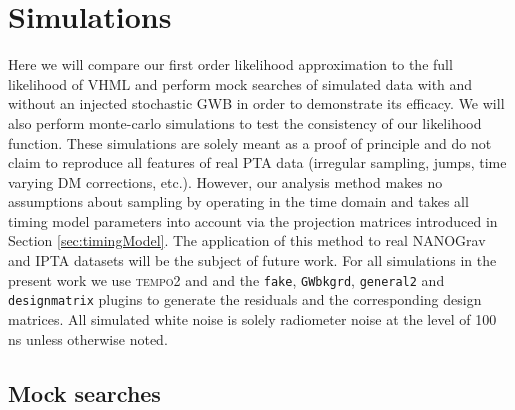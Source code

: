 \documentclass[iop]{emulateapj}
\begin{document}
\section{Simulations}
\label{sec:simulations}

Here we will compare our first order likelihood approximation to the full likelihood of VHML and perform mock searches of simulated data with and without an injected stochastic GWB in order to demonstrate its efficacy. We will also perform monte-carlo simulations to test the consistency of our likelihood function. These simulations are solely meant as a proof of principle and do not claim to reproduce all features of real PTA data (irregular sampling, jumps, time varying DM corrections, etc.). However, our analysis method makes no assumptions about sampling by operating in the time domain and takes all timing model parameters into account via the projection matrices introduced in Section \ref{sec:timingModel}. The application of this method to real NANOGrav and IPTA datasets will be the subject of future work. For all simulations in the present work we use  \textsc{tempo2} and and the \texttt{fake}, \texttt{GWbkgrd}, \texttt{general2} and \texttt{designmatrix} plugins to generate the residuals and the corresponding design matrices. All simulated white noise is solely radiometer noise at the level of 100 ns unless otherwise noted.

\subsection{Mock searches}
\label{sec:mockSearch}
\end{document}
